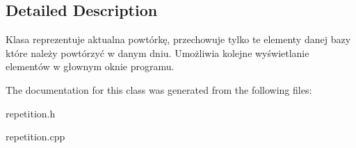 \subsection{Detailed Description}
Klasa reprezentuje aktualna powtórkę, przechowuje tylko te elementy danej bazy które należy powtórzyć w danym dniu. Umożliwia kolejne wyświetlanie elementów w głownym oknie programu. 

The documentation for this class was generated from the following files\+:\begin{DoxyCompactItemize}
\item 
repetition.\+h\item 
repetition.\+cpp\end{DoxyCompactItemize}
